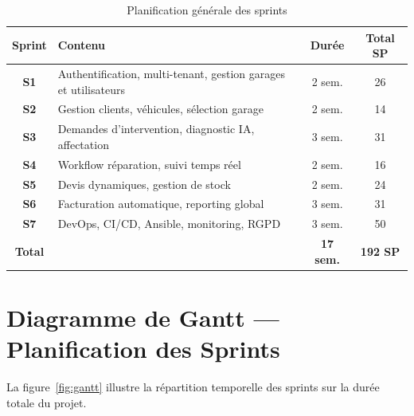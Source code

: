 \documentclass[12pt,a4paper]{report}
\begin{document}
\begin{table}[H]
\centering
\caption{Planification g\'{e}n\'{e}rale des sprints}
\renewcommand{\arraystretch}{1.4}
\begin{tabularx}{\textwidth}{|c|X|c|c|}
\hline
\rowcolor{primary!20}
\textbf{Sprint} & \textbf{Contenu} & \textbf{Dur\'{e}e}
  & \textbf{Total SP} \\
\hline
\textbf{S1} & Authentification, multi-tenant, gestion garages
  et utilisateurs & 2 sem. & 26 \\
\hline
\textbf{S2} & Gestion clients, v\'{e}hicules, s\'{e}lection garage & 2 sem. & 14 \\
\hline
\textbf{S3} & Demandes d'intervention, diagnostic IA, affectation & 3 sem. & 31 \\
\hline
\textbf{S4} & Workflow r\'{e}paration, suivi temps r\'{e}el & 2 sem. & 16 \\
\hline
\textbf{S5} & Devis dynamiques, gestion de stock & 2 sem. & 24 \\
\hline
\textbf{S6} & Facturation automatique, reporting global & 3 sem. & 31 \\
\hline
\textbf{S7} & DevOps, CI/CD, Ansible, monitoring, RGPD & 3 sem. & 50 \\
\hline
\rowcolor{lightgray}
\textbf{Total} & & \textbf{17 sem.} & \textbf{192 SP} \\
\hline
\end{tabularx}
\end{table}

\section{Diagramme de Gantt --- Planification des Sprints}

La figure~\ref{fig:gantt} illustre la r\'{e}partition temporelle
des sprints sur la dur\'{e}e totale du projet.
\end{document}
